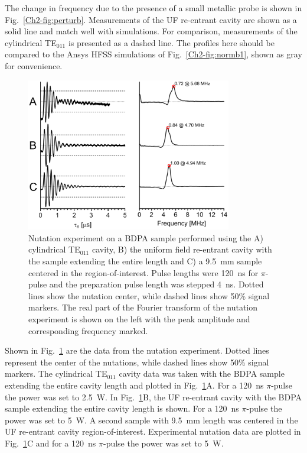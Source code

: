 The change in frequency due to the presence of a small metallic probe is shown in Fig.~\ref{Ch2-fig:perturb}. Measurements of the UF re-entrant \cylTE{} cavity are shown as a solid line and match well with simulations. For comparison, measurements of the cylindrical TE$_{011}$ is presented as a dashed line. The profiles here should be compared to the Ansys HFSS simulations of Fig.~\ref{Ch2-fig:normb1}, shown as gray for convenience. 

\begin{figure}[htb]\centering
 \includegraphics[width=0.8\textwidth]{Kapitel/Ch2-Images/06a-Nutation.eps}
 \caption[Nutation experiment comparison.]{Nutation experiment on a BDPA sample performed using the A) cylindrical TE$_{011}$ cavity, B) the uniform field re-entrant \cylTE{} cavity with the sample extending the entire length and C) a 9.5~mm sample centered in the region-of-interest. Pulse lengths were 120~ns for $\pi$-pulse and the preparation pulse length was stepped 4~ns. Dotted lines show the nutation center, while dashed lines show 50\% signal markers. The real part of the Fourier transform of the nutation experiment is shown on the left with the peak amplitude and corresponding frequency marked.}
 \label{Ch2-fig:nutation}
\end{figure}

Shown in Fig.~\ref{Ch2-fig:nutation} are the data from the nutation experiment. Dotted lines represent the center of the nutations, while dashed lines show 50\% signal markers. The cylindrical TE$_{011}$ cavity data was taken with the BDPA sample extending the entire cavity length and plotted in Fig.~\ref{Ch2-fig:nutation}A. For a 120~ns $\pi$-pulse the power was set to 2.5~W. In Fig.~\ref{Ch2-fig:nutation}B, the UF re-entrant \cylTE{} cavity with the BDPA sample extending the entire cavity length is shown. For a 120~ns $\pi$-pulse the power was set to 5~W. A second sample with 9.5~mm length was centered in the UF re-entrant \cylTE{} cavity region-of-interest. Experimental nutation data are plotted in Fig.~\ref{Ch2-fig:nutation}C and for a 120~ns $\pi$-pulse the power was set to 5~W.

